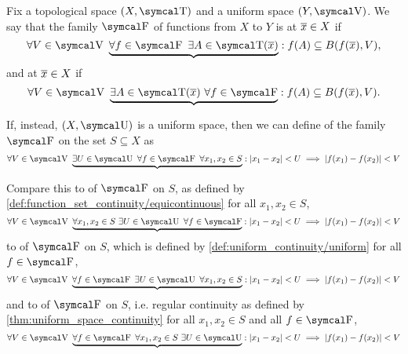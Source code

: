 \begin{definition}\label{def:function_set_continuity}\cite[285]{Bouziad2004}
  Fix a topological space \( (X, \T) \) and a uniform space \( (Y, \V) \). We say that the family \( \F \) of functions from \( X \) to \( Y \) is  at \( \overline{x} \in X \) if
  \begin{equation}\label{def:function_set_continuity/functionwise}
    \forall V \in \V \ \underbrace{\forall f \in \F \ \exists A \in \T(\Ol{x})} : f(A) \subseteq B(f(\Ol{x}), V),
  \end{equation}
  and  at \( \overline{x} \in X \) if
  \begin{equation}\label{def:function_set_continuity/equicontinuous}
    \forall V \in \V \ \underbrace{\exists A \in \T(\Ol{x}) \ \forall f \in \F} : f(A) \subseteq B(f(\Ol{x}), V).
  \end{equation}

  If, instead, \( (X, \U) \) is a uniform space, then we can define  of the family \( \F \) on the set \( S \subseteq X \) as
  \begin{equation}\label{def:function_set_continuity/uniform_equicontinuous}
    \forall V \in \V \ \underbrace{\exists U \in \U \ \forall f \in \F \ \forall x_1, x_2 \in S} : \Abs{x_1 - x_2} < U \implies \Abs{f(x_1) - f(x_2)} < V
  \end{equation}

  Compare this to  of \( \F \) on \( S \), as defined by \cref{def:function_set_continuity/equicontinuous} for all \( x_1, x_2 \in S \),
  \begin{equation}\label{def:function_set_continuity/pointwise_equicontinuous}
    \forall V \in \V \ \underbrace{\forall x_1, x_2 \in S \ \exists U \in \U \ \forall f \in \F} : \Abs{x_1 - x_2} < U \implies \Abs{f(x_1) - f(x_2)} < V
  \end{equation}
  to  of \( \F \) on \( S \), which is defined by \cref{def:uniform_continuity/uniform} for all \( f \in \F \),
  \begin{equation}\label{def:function_set_continuity/uniform_functionwise}
    \forall V \in \V \ \underbrace{\forall f \in \F \ \exists U \in \U \ \forall x_1, x_2 \in S} : \Abs{x_1 - x_2} < U \implies \Abs{f(x_1) - f(x_2)} < V
  \end{equation}
  and to  of \( \F \) on \( S \), i.e. regular continuity as defined by \cref{thm:uniform_space_continuity} for all \( x_1, x_2 \in S \) and all \( f \in \F \),
  \begin{equation}\label{def:function_set_continuity/functionwise_pointwise}
    \forall V \in \V \ \underbrace{\forall f \in \F \ \forall x_1, x_2 \in S \ \exists U \in \U} : \Abs{x_1 - x_2} < U \implies \Abs{f(x_1) - f(x_2)} < V
  \end{equation}
\end{definition}

